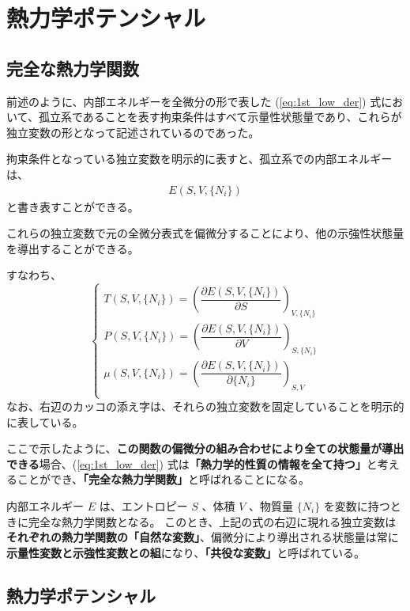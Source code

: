 \documentclass[uplatex,dvipdfmx,a4paper,11pt]{jsarticle}
\newcommand{\difp}[2]{\dfrac{\partial #1}{\partial #2}}
\begin{document}
\newpage

\section{熱力学ポテンシャル}

\subsection{完全な熱力学関数}

前述のように、内部エネルギーを全微分の形で表した (\ref{eq:1st_low_der}) 式において、孤立系であることを表す拘束条件はすべて示量性状態量であり、これらが独立変数の形となって記述されているのであった。

拘束条件となっている独立変数を明示的に表すと、孤立系での内部エネルギーは、
\begin{align}
	E(S, V, \{ N_i \})
\end{align}
と書き表すことができる。

これらの独立変数で元の全微分表式を偏微分することにより、他の示強性状態量を導出することができる。

すなわち、
\begin{equation}
\begin{cases}
T(S, V, \{ N_i \}) = \left( \difp{E(S, V, \{ N_i \})}{S} \right)_{V, \{ N_i \}} \\[10pt]
P(S, V, \{ N_i \}) = \left( \difp{E(S, V, \{ N_i \})}{V} \right)_{S, \{ N_i \}} \\[10pt]
\mu (S, V, \{ N_i \}) = \left( \difp{E(S, V, \{ N_i \})}{\{ N_i \} } \right)_{S, V} \\
\end{cases}
\end{equation}
なお、右辺のカッコの添え字は、それらの独立変数を固定していることを明示的に表している。

ここで示したように、{\bf この関数の偏微分の組み合わせにより全ての状態量が導出できる}場合、(\ref{eq:1st_low_der}) 式は{\bf 「熱力学的性質の情報を全て持つ」}と考えることができ、{\bf 「完全な熱力学関数」}と呼ばれることになる。

内部エネルギー $E$ は、エントロピー $S$ 、体積 $V$ 、物質量 $\{ N_i \}$ を変数に持つときに完全な熱力学関数となる。 
このとき、上記の式の右辺に現れる独立変数は{\bf それぞれの熱力学関数の「自然な変数」}、偏微分により導出される状態量は常に{\bf 示量性変数と示強性変数との組}になり、{\bf 「共役な変数」}と呼ばれている。



\subsection{熱力学ポテンシャル}
\end{document}
